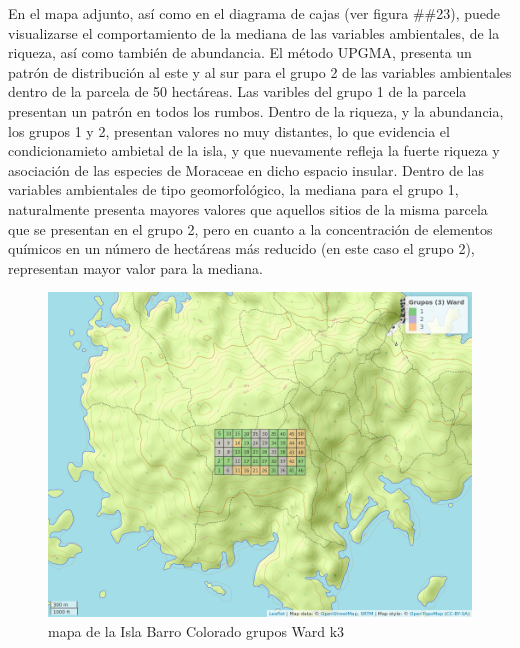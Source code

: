 \documentclass[11pt,]{article}
\begin{document}
En el mapa adjunto, así como en el diagrama de cajas (ver figura
\#\#23), puede visualizarse el comportamiento de la mediana de las
variables ambientales, de la riqueza, así como también de abundancia. El
método UPGMA, presenta un patrón de distribución al este y al sur para
el grupo 2 de las variables ambientales dentro de la parcela de 50
hectáreas. Las varibles del grupo 1 de la parcela presentan un patrón en
todos los rumbos. Dentro de la riqueza, y la abundancia, los grupos 1 y
2, presentan valores no muy distantes, lo que evidencia el
condicionamieto ambietal de la isla, y que nuevamente refleja la fuerte
riqueza y asociación de las especies de Moraceae en dicho espacio
insular. Dentro de las variables ambientales de tipo geomorfológico, la
mediana para el grupo 1, naturalmente presenta mayores valores que
aquellos sitios de la misma parcela que se presentan en el grupo 2, pero
en cuanto a la concentración de elementos químicos en un número de
hectáreas más reducido (en este caso el grupo 2), representan mayor
valor para la mediana.

\begin{figure}
\centering
\includegraphics[width=1.00000\textwidth]{mapa_ward_k3.png}
\caption{mapa de la Isla Barro Colorado grupos Ward k3
\label{fig:bci_map}}
\end{figure}
\end{document}
